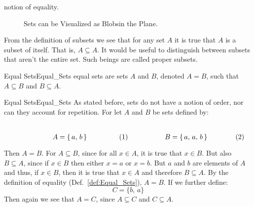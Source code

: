         notion of equality.
        \begin{figure}[H]
            \centering
            
            \caption[Visual for Subsets]
                    {Sets can be Visualized as Blobsin the Plane.}
            \label{fig:Subset_Blobs}
        \end{figure}
        From the definition of subsets we see that for any set $A$ it is
        true that $A$ is a subset of itself. That is, $A\subseteq{A}$. It
        would be useful to distinguish between subsets that aren't the entire
        set. Such beings are called proper subsets.
        \begin{fdefinition}{Equal Sets}{Equal_Sets}
            \Glspl{equal set} are sets $A$ and $B$, denoted $A=B$, such that
            $A\subseteq{B}$ and $B\subseteq{A}$.
        \end{fdefinition}
        \begin{fexample}{Equal Sets}{Equal_Sets}
            As stated before, sets do not have a notion of order,
            nor can they account for repetition. For let $A$ and $B$
            be sets defined by:
            \par
            \begin{subequations}
                \begin{minipage}[b]{0.49\textwidth}
                    \centering
                    \begin{equation}
                        A=\{\,a,\,b\,\}
                    \end{equation}
                \end{minipage}
                \hfill
                \begin{minipage}[b]{0.49\textwidth}
                    \centering
                    \begin{equation}
                        B=\{\,a,\,a,\,b\,\}
                    \end{equation}
                \end{minipage}
            \end{subequations}
            \par\vspace{2.5ex}
            Then $A=B$. For $A\subseteq{B}$, since for all $x\in{A}$, it is
            true that $x\in{B}$. But also $B\subseteq{A}$, since if
            $x\in{B}$ then either $x=a$ or $x=b$. But $a$ and $b$ are elements
            of $A$ and thus, if $x\in{B}$, then it is true that $x\in{A}$
            and therefore $B\subseteq{A}$. By the definition of equality
            (Def.~\ref{def:Equal_Sets}), $A=B$. If we further define:
            \begin{equation}
                C=\{b,\,a\}
            \end{equation}
            Then again we see that $A=C$, since $A\subseteq{C}$ and
            $C\subseteq{A}$.
        \end{fexample}
